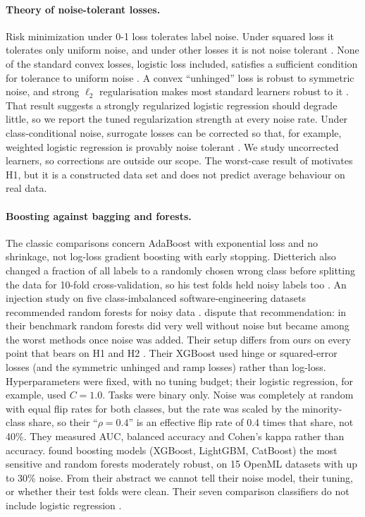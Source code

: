 \documentclass[11pt]{article}
\begin{document}
\paragraph{Theory of noise-tolerant losses.} Risk minimization under 0-1 loss tolerates
label noise. Under squared loss it tolerates only uniform noise, and under other losses it
is not noise tolerant \citep{manwani2013}. None of the standard convex losses, logistic
loss included, satisfies a sufficient condition for tolerance to uniform noise
\citep{ghosh2015}. A convex ``unhinged'' loss is robust to symmetric noise, and strong
$\ell_2$ regularisation makes most standard learners robust to it \citep{vanrooyen2015}. That
result suggests a strongly regularized logistic regression should degrade little, so we
report the tuned regularization strength at every noise rate. Under class-conditional noise,
surrogate losses can be corrected so that, for example, weighted logistic regression is
provably noise tolerant \citep{natarajan2013}. We study uncorrected learners, so
corrections are outside our scope. The worst-case result of \citet{long2010} motivates H1,
but it is a constructed data set and does not predict average behaviour on real data.

\paragraph{Boosting against bagging and forests.} The classic comparisons
\citep{dietterich2000,breiman2001} concern AdaBoost with exponential loss and no shrinkage,
not log-loss gradient boosting \citep{friedman2001} with early stopping. Dietterich also
changed a fraction of all labels to a randomly chosen wrong class before splitting the data
for 10-fold cross-validation, so his test folds held noisy labels too
\citep{dietterich2000}. %
An injection
study on five class-imbalanced software-engineering datasets recommended random forests for
noisy data \citep{folleco2008}. \citet{lebaher2020} dispute that recommendation: in their
benchmark random forests did very well without noise but became among the worst methods
once noise was added. %
Their setup differs from ours on every point that bears on H1 and H2
\citep{lebaher2020}. %
Their XGBoost used hinge or squared-error losses (and the symmetric unhinged and ramp
losses) rather than log-loss. Hyperparameters were fixed, with no tuning budget; their
logistic regression, for example, used $C = 1.0$. Tasks were binary only. Noise was
completely at random with equal flip rates for both classes, but the rate was scaled by the
minority-class share, so their ``$\rho=0.4$'' is an effective flip rate of 0.4 times that
share, not 40\%. They measured AUC, balanced accuracy and Cohen's kappa rather than accuracy.
\citet{nawaz2025} found boosting
models (XGBoost, LightGBM, CatBoost) the most sensitive and random forests moderately
robust, on 15 OpenML datasets with up to 30\% noise. From their abstract we cannot tell their
noise model, their tuning, or whether their test folds were clean. Their seven comparison
classifiers do not include logistic regression \citep{nawaz2025}. %
\end{document}
